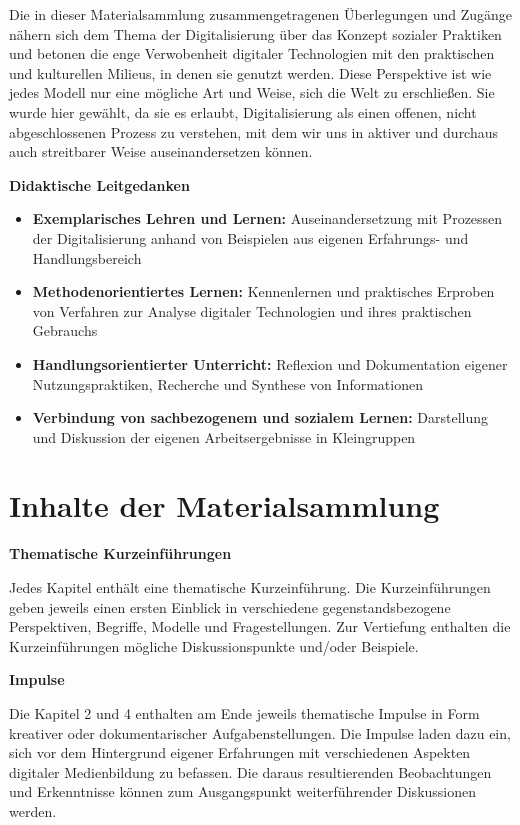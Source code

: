 \documentclass[
  a4paper,
]{book}
\providecommand{\tightlist}{%
  \setlength{\itemsep}{0pt}\setlength{\parskip}{0pt}}
\begin{document}
Die in dieser Materialsammlung zusammengetragenen Überlegungen und Zugänge nähern sich dem Thema der Digitalisierung über das Konzept sozialer Praktiken und betonen die enge Verwobenheit digitaler Technologien mit den praktischen und kulturellen Milieus, in denen sie genutzt werden. Diese Perspektive ist wie jedes Modell nur eine mögliche Art und Weise, sich die Welt zu erschließen. Sie wurde hier gewählt, da sie es erlaubt, Digitalisierung als einen offenen, nicht abgeschlossenen Prozess zu verstehen, mit dem wir uns in aktiver und durchaus auch streitbarer Weise auseinandersetzen können.

\textbf{Didaktische Leitgedanken}

\begin{itemize}
\tightlist
\item
  \textbf{Exemplarisches Lehren und Lernen:} Auseinandersetzung mit Prozessen der Digitalisierung anhand von Beispielen aus eigenen Erfahrungs- und Handlungsbereich
\item
  \textbf{Methodenorientiertes Lernen:} Kennenlernen und praktisches Erproben von Verfahren zur Analyse digitaler Technologien und ihres praktischen Gebrauchs
\item
  \textbf{Handlungsorientierter Unterricht:} Reflexion und Dokumentation eigener Nutzungspraktiken, Recherche und Synthese von Informationen
\item
  \textbf{Verbindung von sachbezogenem und sozialem Lernen:} Darstellung und Diskussion der eigenen Arbeitsergebnisse in Kleingruppen
\end{itemize}

\section{Inhalte der Materialsammlung}\label{inhalte-der-materialsammlung}

\textbf{Thematische Kurzeinführungen}

Jedes Kapitel enthält eine thematische Kurzeinführung. Die Kurzeinführungen geben jeweils einen ersten Einblick in verschiedene gegenstandsbezogene Perspektiven, Begriffe, Modelle und Fragestellungen. Zur Vertiefung enthalten die Kurzeinführungen mögliche Diskussionspunkte und/oder Beispiele.

\textbf{Impulse}

Die Kapitel 2 und 4 enthalten am Ende jeweils thematische Impulse in Form kreativer oder dokumentarischer Aufgabenstellungen. Die Impulse laden dazu ein, sich vor dem Hintergrund eigener Erfahrungen mit verschiedenen Aspekten digitaler Medienbildung zu befassen. Die daraus resultierenden Beobachtungen und Erkenntnisse können zum Ausgangspunkt weiterführender Diskussionen werden.
\end{document}
